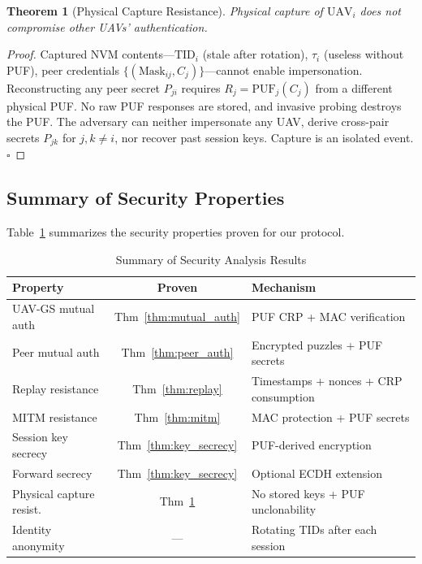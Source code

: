 \documentclass[11pt,a4paper]{article}
\newtheorem{theorem}{Theorem}
\begin{document}
\begin{theorem}[Physical Capture Resistance]
\label{thm:capture}
Physical capture of $\text{UAV}_i$ does not compromise other UAVs' authentication.
\end{theorem}

\begin{proof}
Captured NVM contents---$\text{TID}_i$ (stale after rotation), $\tau_i$ (useless without PUF), peer credentials $\{(\text{Mask}_{ij}, C_j)\}$---cannot enable impersonation. Reconstructing any peer secret $P_{ji}$ requires $R_j = \text{PUF}_j(C_j)$ from a different physical PUF. No raw PUF responses are stored, and invasive probing destroys the PUF. The adversary can neither impersonate any UAV, derive cross-pair secrets $P_{jk}$ for $j,k \neq i$, nor recover past session keys. Capture is an isolated event. \hfill$\square$
\end{proof}

\subsection{Summary of Security Properties}

Table~\ref{tab:security_summary} summarizes the security properties proven for our protocol.

\begin{table}[H]
\centering
\caption{Summary of Security Analysis Results}
\label{tab:security_summary}
\begin{tabular}{@{}p{4.5cm}cp{4cm}@{}}
\toprule
\textbf{Property} & \textbf{Proven} & \textbf{Mechanism} \\
\midrule
UAV-GS mutual auth & Thm~\ref{thm:mutual_auth} & PUF CRP + MAC verification \\
Peer mutual auth & Thm~\ref{thm:peer_auth} & Encrypted puzzles + PUF secrets \\
Replay resistance & Thm~\ref{thm:replay} & Timestamps + nonces + CRP consumption \\
MITM resistance & Thm~\ref{thm:mitm} & MAC protection + PUF secrets \\
Session key secrecy & Thm~\ref{thm:key_secrecy} & PUF-derived encryption \\
Forward secrecy & Thm~\ref{thm:key_secrecy} & Optional ECDH extension \\
Physical capture resist. & Thm~\ref{thm:capture} & No stored keys + PUF unclonability \\
Identity anonymity & --- & Rotating TIDs after each session \\
\bottomrule
\end{tabular}
\end{table}
\end{document}
